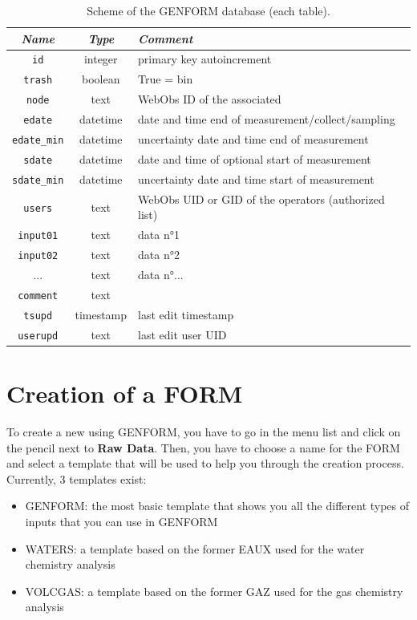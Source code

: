 \begin{table}
	\centering
	\begin{tabular}{c c l}
		\hline
		\textit{Name} & \textit{Type} & \textit{Comment} \\
		\hline
		{\tt id}         & integer  & primary key autoincrement\\
		{\tt trash}      & boolean  & True = bin	\\
		{\tt node}       & text     & WebObs ID of the associated \wo{node} \\
		{\tt edate}      & datetime & date and time end of measurement/collect/sampling \\
		{\tt edate\_min} & datetime & uncertainty date and time end of measurement \\
		{\tt sdate}      & datetime & date and time of optional start of measurement \\
		{\tt sdate\_min} & datetime & uncertainty date and time start of measurement \\
		{\tt users}      & text     & WebObs UID or GID of the operators (authorized list) \\
		{\tt input01}    & text     & data n°1 \\
		{\tt input02}    & text     & data n°2 \\
		...              & text     & data n°... \\
		{\tt comment}    & text     & \\
		{\tt tsupd}      & timestamp & last edit timestamp \\
		{\tt userupd}    & text     & last edit user UID \\
		\hline
	\end{tabular}
	\caption{Scheme of the GENFORM database (each table).}
	\label{table:genform_db}
\end{table}


\section{Creation of a FORM} \label{genform_creation}

To create a new  using GENFORM, you have to go in the  menu list and click on the pencil next to \textbf{Raw Data}. Then, you have to choose a name for the FORM and select a template that will be used to help you through the creation process. Currently, 3 templates exist:

\begin{itemize}
	\item GENFORM: the most basic template that shows you all the different types of inputs that you can use in GENFORM
	\item WATERS: a template based on the former EAUX  used for the water chemistry analysis
	\item VOLCGAS: a template based on the former GAZ  used for the gas chemistry analysis
\end{itemize}

